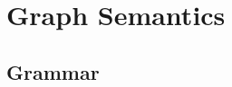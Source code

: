 \documentclass{article}
\begin{document}


    \section{Graph Semantics}

      \subsection{Grammar}

      \begin{grammar}
        \grule[graph]{\ggraph}{ \{\gedge, \ldots\} }
        \grule[edges]{\gedge}{
                    \gnode \gsBefore \gnode
            \gor    \gnode \gsSkip \gnode
        }
        \grule[nodes]{\gnode}{
                    \gsstart
            \gor    \gsend
            \gor    \gsLR{\olbl, \omstack, \gtime}
            \gor    \gsLR{\genter \olbl, \gtime}
            \gor    \gsLR{\gleave \olbl, \gtime}
        }

      \end{grammar}
\end{document}
